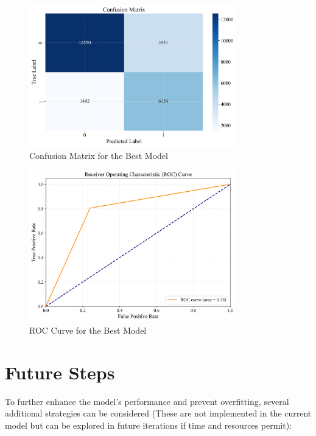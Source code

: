 \begin{figure}
    \centering
    \includegraphics[width=0.8\textwidth]{figures/Figure33.png}
    \caption{Confusion Matrix for the Best Model}
    \label{fig:cha-4 figure1}
\end{figure}

\begin{figure}
    \centering
    \includegraphics[width=0.8\textwidth]{figures/Figure34.png}
    \caption{ROC Curve for the Best Model}
    \label{fig:cha-4 figure2}
\end{figure}

\section{Future Steps}
\label{sec:chap4 section 3}

To further enhance the model's performance and prevent overfitting, several additional strategies can be considered (These are not implemented in the current model but can be explored in future iterations if time and resources permit):

